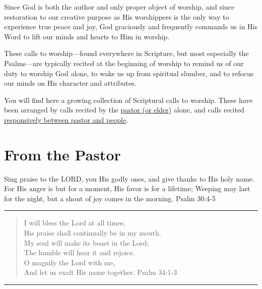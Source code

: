\documentclass[]{book}
\begin{document}
Since God is both the author and only proper object of worship, and since restoration to our creative purpose as His worshippers is the only way to experience true peace and joy, God graciously and frequently commands us in His Word to lift our minds and hearts to Him in worship.

These calls to worship---found everywhere in Scripture, but most especially the Psalms---are typically recited at the beginning of worship to remind us of our duty to worship God alone, to wake us up from spiritual slumber, and to refocus our minds on His character and attributes.

You will find here a growing collection of Scriptural calls to worship. These have been arranged by calls recited by the \protect\hyperlink{from-the-fastor}{pastor (or elder)} alone, and calls recited \protect\hyperlink{responsive-calls}{responsively between pastor and people}.

\hypertarget{from-the-pastor}{%
\section*{From the Pastor}\label{from-the-pastor}}

\begin{FOO}
Sing praise to the LORD, you His godly ones, and give thanks to His holy
name. For His anger is but for a moment, His favor is for a lifetime;
Weeping may last for the night, but a shout of joy comes in the morning.
\textbar{} Psalm 30:4-5
\end{FOO}

\begin{center}\rule{0.5\linewidth}{\linethickness}\end{center}

\begin{quote}
I will bless the Lord at all times;\\
His praise shall continually be in my mouth.\\
My soul will make its boast in the Lord;\\
The humble will hear it and rejoice.\\
O magnify the Lord with me,\\
And let us exalt His name together. \textbar{} Psalm 34:1-3
\end{quote}

\begin{center}\rule{0.5\linewidth}{\linethickness}\end{center}
\end{document}
